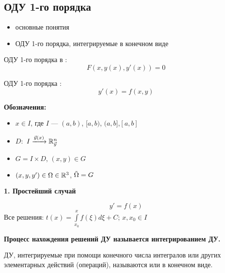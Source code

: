\subsection{\large{ОДУ 1-го порядка}}   

\begin{itemize}
    \item основные понятия
    \item ОДУ 1-го порядка, интегрируемые в конечном виде
\end{itemize}

ОДУ 1-го порядка в :
\begin{equation}\label{2.1}
    F(x, y(x), y'(x)) = 0
\end{equation}

ОДУ 1-го порядка :
\begin{equation}\label{2.2}
    y'(x) = f(x, y)
\end{equation}

\vspace{3mm}

\textbf{Обозначения:}
\begin{itemize}
    \item $x \in I$, где $I$ --- $(a,b)$, $[a,b)$, $(a, b]$,$[a,b]$
    \item $D:$ $ I \xrightarrow{\vec{y}(x)} \mathbb{R}^n_{\vec{y}}$
    \item $G = I \times D$, $(x, y) \in G$
    \item $(x, y, y') \in \Omega \in \mathbb{R}^3$, $\Tilde{\Omega} = G$
\end{itemize}
\newpage
\begin{center}
\textbf{\large{1. Простейший  случай}}
\end{center}
\begin{equation}\label{2.3}
    y' = f(x)
\end{equation}
Все решения: $ \displaystyle t (x) = \int\limits_{x_0}^x f(\xi)d\xi + C$; $x, x_0 \in I$

\vspace{3mm}

\textbf{Процесс нахождения решений ДУ называется интегрированием ДУ.}

\begin{Def}
    ДУ, интегрируемые при помощи конечного числа интегралов или других элементарных действий (операций), называются  или в конечном виде.
\end{Def}

